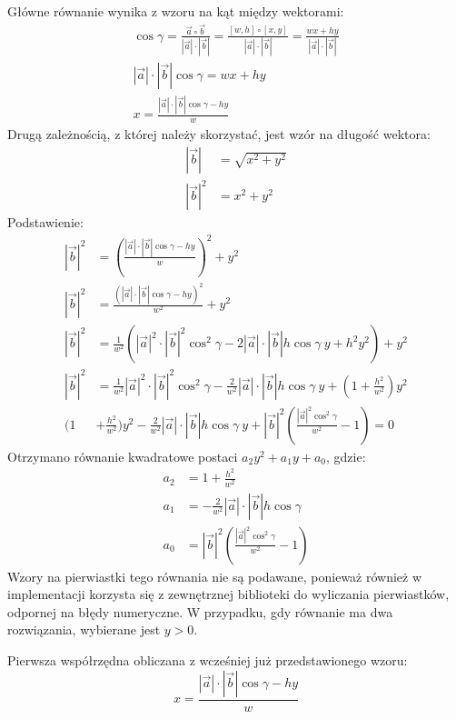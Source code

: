 Główne równanie wynika z wzoru na kąt między wektorami:
\begin{gather*}
\cos \gamma = \frac{\vec{a}\circ\vec{b}}{|\vec{a}|\cdot |\vec{b}|} = \frac{[w, h]\circ[x, y]}{|\vec{a}|\cdot |\vec{b}|} = \frac{wx + hy}{|\vec{a}|\cdot |\vec{b}|} \\[1em]
|\vec{a}|\cdot |\vec{b}| \cos \gamma = wx + hy \\[1em]
x = \frac{|\vec{a}|\cdot |\vec{b}| \cos \gamma - hy}{w}
\end{gather*}
Drugą zależnością, z której należy skorzystać, jest wzór na długość wektora:
\begin{align*}
|\vec{b}| &= \sqrt{x^2 + y^2} \\
|\vec{b}|^2 &= x^2 + y^2
\end{align*}
Podstawienie:
\begin{align*}
|\vec{b}|^2 &= \left(\frac{|\vec{a}|\cdot |\vec{b}| \cos \gamma - hy}{w}\right)^2 + y^2 \\ 
|\vec{b}|^2 &= \frac{(|\vec{a}|\cdot |\vec{b}| \cos \gamma - hy)^2}{w^2} + y^2 \\ 
|\vec{b}|^2 &= \frac{1}{w^2}\left(|\vec{a}|^2\cdot |\vec{b}|^2 \cos^2 \gamma - 2|\vec{a}|\cdot |\vec{b}|h \cos \gamma\ y + h^2 y^2\right) + y^2 \\ 
|\vec{b}|^2 &= \frac{1}{w^2}|\vec{a}|^2\cdot |\vec{b}|^2 \cos^2 \gamma - \frac{2}{w^2}|\vec{a}|\cdot |\vec{b}|h \cos \gamma\ y + \left(1 + \frac{h^2}{w^2}\right) y^2 \\
\bigg(1 &+ \frac{h^2}{w^2}\bigg)  y^2 - \frac{2}{w^2}|\vec{a}|\cdot |\vec{b}|h \cos \gamma\ y + |\vec{b}|^2\left(\frac{|\vec{a}|^2 \cos^2 \gamma}{w^2} - 1 \right) = 0
\end{align*}
Otrzymano równanie kwadratowe postaci $a_2y^2 + a_1y + a_0$, gdzie:
\begin{align*}
a_2 &= 1 + \frac{h^2}{w^2} \\
a_1 &= -\frac{2}{w^2}|\vec{a}|\cdot |\vec{b}|h \cos \gamma \\
a_0 &= |\vec{b}|^2\left(\frac{|\vec{a}|^2 \cos^2 \gamma}{w^2} - 1 \right)
\end{align*}
Wzory na pierwiastki tego równania nie są podawane, ponieważ również w implementacji korzysta się z zewnętrznej biblioteki do wyliczania pierwiastków, odpornej na błędy numeryczne. W przypadku, gdy równanie ma dwa rozwiązania, wybierane jest $y >0$.

Pierwsza współrzędna obliczana z wcześniej już przedstawionego wzoru:
\[
x = \frac{|\vec{a}|\cdot |\vec{b}| \cos \gamma - hy}{w}
\]

